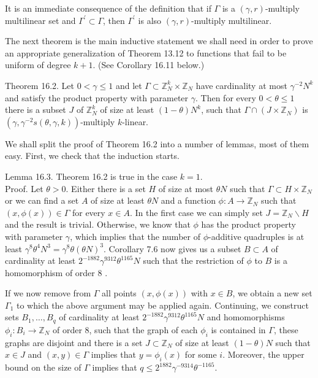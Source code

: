 \documentclass[10pt]{article}
\begin{document}
It is an immediate consequence of the definition that if $\Gamma$ is a $(\gamma, r)$-multiply multilinear set and $\Gamma^{\prime} \subset \Gamma$, then $\Gamma^{\prime}$ is also $(\gamma, r)$-multiply multilinear.

The next theorem is the main inductive statement we shall need in order to prove an appropriate generalization of Theorem 13.12 to functions that fail to be uniform of degree $k+1$. (See Corollary 16.11 below.)

Theorem 16.2. Let $0<\gamma\leqslant1$ and let $\Gamma \subset \mathbb{Z}_{N}^{k} \times \mathbb{Z}_{N}$ have cardinality at most $\gamma^{-2} N^{k}$ and satisfy the product property with parameter $\gamma$. Then for every $0<\theta\leqslant1$ there is a subset $J$ of $\mathbb{Z}_{N}^{k}$ of size at least $(1-\theta) N^{k}$, such that $\Gamma \cap\left(J \times \mathbb{Z}_{N}\right)$ is $\left(\gamma, \gamma^{-2} s(\theta, \gamma, k)\right)$-multiply $k$-linear.

We shall split the proof of Theorem 16.2 into a number of lemmas, most of them easy. First, we check that the induction starts.

Lemma 16.3. Theorem 16.2 is true in the case $k=1$.\\
Proof. Let $\theta>0$. Either there is a set $H$ of size at most $\theta N$ such that $\Gamma \subset H \times \mathbb{Z}_{N}$ or we can find a set $A$ of size at least $\theta N$ and a function $\phi: A \rightarrow \mathbb{Z}_{N}$ such that $(x, \phi(x)) \in \Gamma$ for every $x \in A$. In the first case we can simply set $J=\mathbb{Z}_{N} \backslash H$ and the result is trivial. Otherwise, we know that $\phi$ has the product property with parameter $\gamma$, which implies that the number of $\phi$-additive quadruples is at least $\gamma^{8} \theta^{4} N^{3}=\gamma^{8} \theta(\theta N)^{3}$. Corollary 7.6 now gives us a subset $B \subset A$ of cardinality at least $2^{-1882} \gamma^{9312} \theta^{1165} N$ such that the restriction of $\phi$ to $B$ is a homomorphism of order 8 .

If we now remove from $\Gamma$ all points $(x, \phi(x))$ with $x \in B$, we obtain a new set $\Gamma_{1}$ to which the above argument may be applied again. Continuing, we construct sets $B_{1}, \ldots, B_{q}$ of cardinality at least $2^{-1882} \gamma^{9312} \theta^{1165} N$ and homomorphisms $\phi_{i}: B_{i} \rightarrow \mathbb{Z}_{N}$ of order 8, such that the graph of each $\phi_{i}$ is contained in $\Gamma$, these graphs are disjoint and there is a set $J \subset \mathbb{Z}_{N}$ of size at least $(1-\theta) N$ such that $x \in J$ and $(x, y) \in \Gamma$ implies that $y=\phi_{i}(x)$ for some $i$. Moreover, the upper bound on the size of $\Gamma$ implies that $q \leqslant 2^{1882} \gamma^{-9314} \theta^{-1165}$.
\end{document}
